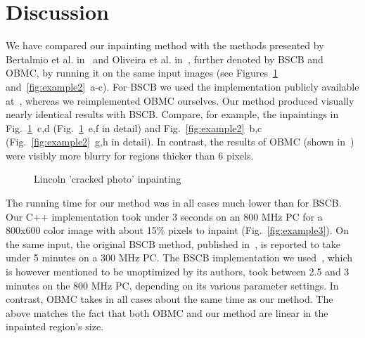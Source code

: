 \documentclass{llncs}
\begin{document}
\section{Discussion}
\label{sec:discussion}
%
%
   We have compared our inpainting method with the methods presented
by Bertalmio et al. in~\cite{bertalmio1} and Oliveira et al. in~\cite{oliveira}, further denoted by
BSCB and OBMC, by running it on the same input images (see Figures~\ref{fig:example1}
and~\ref{fig:example2}~a-c). For BSCB we used the implementation publicly available
at~\cite{implem}, whereas we reimplemented OBMC ourselves. 
Our method produced visually nearly identical results with BSCB. Compare, for example, the
inpaintings in Fig.~\ref{fig:example1}~c,d (Fig.~\ref{fig:example1}~e,f in
detail) and Fig.~\ref{fig:example2}~b,c (Fig.~\ref{fig:example2}~g,h in detail).
In contrast, the results of OBMC (shown in~\cite{oliveira}) 
were visibly more blurry for regions thicker than 6 pixels. 
%
	\begin{figure}[h] \centering
	\caption{Lincoln 'cracked photo' inpainting}
	\label{fig:example1} 
        \end{figure} 
%
%   
  The running time for our method was in all cases much lower than for
BSCB. Our C++ implementation took under 3 seconds on an 800 MHz PC for a 800x600
color image with about 15\% pixels to inpaint (Fig.~\ref{fig:example3}).
On the same input, the original BSCB method, published in~\cite{bertalmio1}, is reported to take under 5 minutes on a
300 MHz PC. The BSCB implementation we used~\cite{implem}, which is
however mentioned to be unoptimized by its authors, took between 2.5 and 3 minutes on the 800
MHz PC, depending on its various parameter settings.
In contrast, OBMC takes in all cases about the same time as our method.
The above matches the fact that both OBMC and our method are linear
in the inpainted region's size. 
\end{document}
